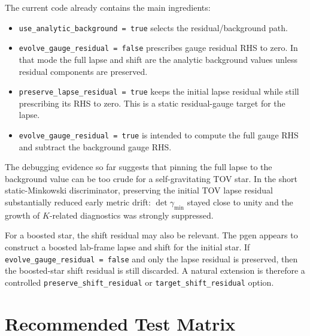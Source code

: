 \documentclass[11pt]{article}
\begin{document}
The current code already contains the main ingredients:
\begin{itemize}
  \item \verb|use_analytic_background = true| selects the residual/background
  path.
  \item \verb|evolve_gauge_residual = false| prescribes gauge residual RHS
  to zero.  In that mode the full lapse and shift are the analytic background
  values unless residual components are preserved.
  \item \verb|preserve_lapse_residual = true| keeps the initial lapse residual
  while still prescribing its RHS to zero.  This is a static residual-gauge
  target for the lapse.
  \item \verb|evolve_gauge_residual = true| is intended to compute the full
  gauge RHS and subtract the background gauge RHS.
\end{itemize}

The debugging evidence so far suggests that pinning the full lapse to the
background value can be too crude for a self-gravitating TOV star.  In the
short static-Minkowski discriminator, preserving the initial TOV lapse residual
substantially reduced early metric drift: \(\det\gamma_{\min}\) stayed close
to unity and the growth of \(K\)-related diagnostics was strongly suppressed.

For a boosted star, the shift residual may also be relevant.  The pgen appears
to construct a boosted lab-frame lapse and shift for the initial star.  If
\verb|evolve_gauge_residual = false| and only the lapse residual is preserved,
then the boosted-star shift residual is still discarded.  A natural extension
is therefore a controlled \verb|preserve_shift_residual| or
\verb|target_shift_residual| option.

\section{Recommended Test Matrix}
\end{document}
